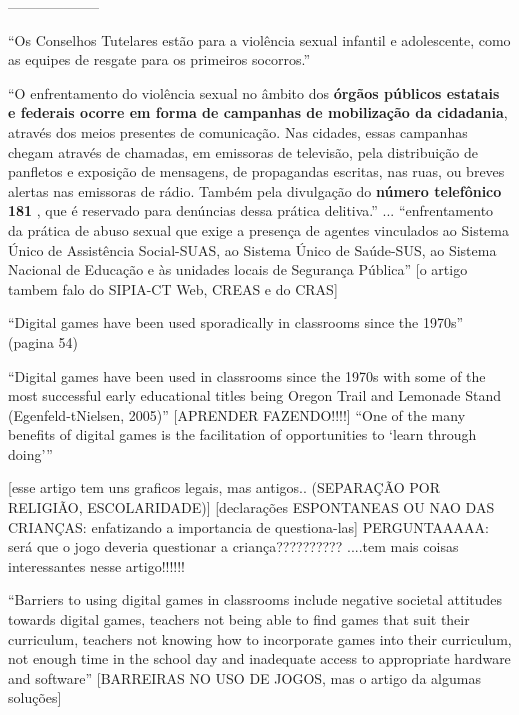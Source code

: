 -------------------- 


``Os Conselhos Tutelares estão para a violência sexual infantil e adolescente, como as equipes de resgate para os primeiros socorros.'' \cite{caccia2014conselheiros}

``O enfrentamento do violência sexual no âmbito dos \textbf{órgãos públicos estatais e federais ocorre em forma de campanhas de mobilização da cidadania}, através dos meios presentes de comunicação. Nas cidades, essas campanhas chegam através de chamadas, em emissoras de televisão, pela distribuição de panfletos e exposição de mensagens, de propagandas escritas, nas ruas, ou breves alertas nas emissoras de rádio. Também pela divulgação do \textbf{número telefônico 181} , que é reservado para denúncias dessa prática delitiva.'' ... ``enfrentamento da prática de abuso sexual que exige a presença de agentes vinculados ao Sistema Único de Assistência Social-SUAS, ao Sistema Único de Saúde-SUS, ao Sistema Nacional de Educação e às unidades locais de Segurança Pública'' [o artigo tambem falo do SIPIA-CT Web, CREAS e do CRAS] \cite{caccia2014conselheiros}

``Digital games have been used sporadically in classrooms since the 1970s'' (pagina 54) \cite{dip2016advancing}

``Digital games have been used in classrooms since the 1970s with some of the most successful early educational titles being Oregon Trail and Lemonade Stand (Egenfeld-tNielsen, 2005)''\cite{dip2016advancing}
[APRENDER FAZENDO!!!!]
``One of the many benefits of digital games is the facilitation of opportunities to ‘learn through doing’'' \cite{dip2016advancing}

[esse artigo tem uns graficos legais, mas antigos.. (SEPARAÇÃO POR RELIGIÃO, ESCOLARIDADE)] [declarações ESPONTANEAS OU NAO DAS CRIANÇAS: enfatizando a importancia de questiona-las] PERGUNTAAAAA: será que o jogo deveria questionar a criança?????????? \cite{cardoso2016abuso} ....tem mais coisas interessantes nesse artigo!!!!!!




``Barriers to using digital games in classrooms include negative societal attitudes towards digital games, teachers not being able to find games that suit their curriculum, teachers not knowing how to incorporate games into their curriculum, not enough time in the school day and inadequate access to appropriate hardware and software'' [BARREIRAS NO USO DE JOGOS, mas o artigo da algumas soluções] \cite{dip2016advancing}


